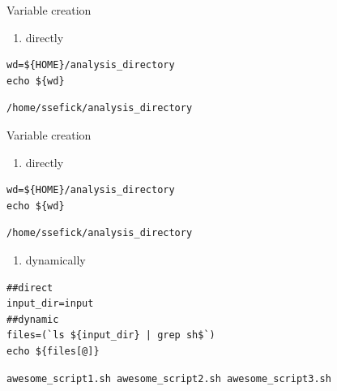 \documentclass[t,10pt]{beamer}
\begin{document}
\begin{frame}[fragile,label={sec:orgheadline14}]{Variable creation}
 \begin{enumerate}
\item directly
\end{enumerate}
\lstset{language=sh,label= ,caption= ,captionpos=b,numbers=none}
\begin{lstlisting}
wd=${HOME}/analysis_directory
echo ${wd}
\end{lstlisting}

\begin{verbatim}
/home/ssefick/analysis_directory
\end{verbatim}
\end{frame}

\begin{frame}[fragile,label={sec:orgheadline15}]{Variable creation}
 \begin{enumerate}
\item directly
\end{enumerate}
\lstset{language=sh,label= ,caption= ,captionpos=b,numbers=none}
\begin{lstlisting}
wd=${HOME}/analysis_directory
echo ${wd}
\end{lstlisting}

\begin{verbatim}
/home/ssefick/analysis_directory
\end{verbatim}

\begin{enumerate}
\item dynamically
\end{enumerate}
\lstset{language=sh,label= ,caption= ,captionpos=b,numbers=none}
\begin{lstlisting}
##direct
input_dir=input
##dynamic
files=(`ls ${input_dir} | grep sh$`)
echo ${files[@]}
\end{lstlisting}

\begin{verbatim}
awesome_script1.sh awesome_script2.sh awesome_script3.sh
\end{verbatim}
\end{frame}
\end{document}
